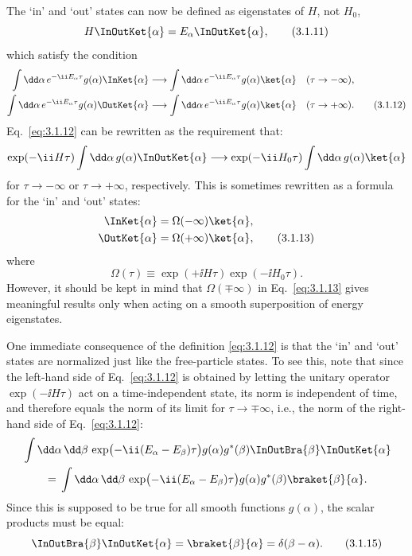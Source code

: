 The `in' and `out' states can now be defined as eigenstates of $H$, not $H_0$,
\begin{equation}
H\InOutKet{\alpha}
=E_\alpha\InOutKet{\alpha},
\tag{3.1.11}\label{eq:3.1.11}
\end{equation}
which satisfy the condition
\begin{align}
\int \dd\alpha\,e^{-\ii E_\alpha\tau}g(\alpha)
\InKet{\alpha}
&\longrightarrow
\int \dd\alpha\,e^{-\ii E_\alpha\tau}g(\alpha)\ket{\alpha}
&& (\tau\to-\infty),
\notag\\
\int \dd\alpha\,e^{-\ii E_\alpha\tau}g(\alpha)
\OutKet{\alpha}
&\longrightarrow
\int \dd\alpha\,e^{-\ii E_\alpha\tau}g(\alpha)\ket{\alpha}
&& (\tau\to+\infty).
\tag{3.1.12}\label{eq:3.1.12}
\end{align}
Eq.~\eqref{eq:3.1.12} can be rewritten as the requirement that:
\begin{align*}
\exp(-\ii H\tau)\int \dd\alpha\,g(\alpha)
\InOutKet{\alpha}
\longrightarrow
\exp(-\ii H_0\tau)\int \dd\alpha\,g(\alpha)\ket{\alpha}
\end{align*}
for $\tau\to-\infty$ or $\tau\to+\infty$, respectively. This is sometimes
rewritten as a formula for the `in' and `out' states:
\begin{align}
\InKet{\alpha}&=\Omega(-\infty)\ket{\alpha},
\notag\\
\OutKet{\alpha}&=\Omega(+\infty)\ket{\alpha},
\tag{3.1.13}\label{eq:3.1.13}
\end{align}
where
\begin{equation}
\Omega(\tau)\equiv\exp(+\ii H\tau)\exp(-\ii H_0\tau).
\tag{3.1.14}\label{eq:3.1.14}
\end{equation}
However, it should be kept in mind that $\Omega(\mp\infty)$ in
Eq.~\eqref{eq:3.1.13} gives meaningful results only when acting on a smooth
superposition of energy eigenstates.

One immediate consequence of the definition \eqref{eq:3.1.12} is that the `in' and
`out' states are normalized just like the free-particle states. To see this,
note that since the left-hand side of Eq.~\eqref{eq:3.1.12} is obtained by letting the
unitary operator $\exp(-\ii H\tau)$ act on a time-independent state, its norm is
independent of time, and therefore equals the norm of its limit for
$\tau\to\mp\infty$, i.e., the norm of the right-hand side of Eq.~\eqref{eq:3.1.12}:
\begin{align*}
&\int \dd\alpha\,\dd\beta\,
\exp\bigl(-\ii(E_\alpha-E_\beta)\tau\bigr)
g(\alpha)g^*(\beta)
\InOutBra{\beta}\InOutKet{\alpha}
\\
&\qquad={}
\int \dd\alpha\,\dd\beta\,
\exp\bigl(-\ii(E_\alpha-E_\beta)\tau\bigr)
g(\alpha)g^*(\beta)\braket{\beta}{\alpha}.
\end{align*}
Since this is supposed to be true for all smooth functions $g(\alpha)$, the
scalar products must be equal:
\begin{equation}
\InOutBra{\beta}\InOutKet{\alpha}
=\braket{\beta}{\alpha}=\delta(\beta-\alpha).
\tag{3.1.15}\label{eq:3.1.15}
\end{equation}


